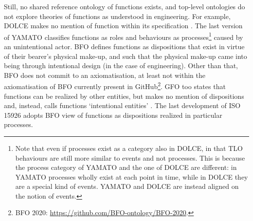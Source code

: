 \documentclass[sw]{iosart2x}
\newcommand{\DOLCE}{\textsc{DOLCE}\xspace} %
\newcommand{\YAMATO}{\textsc{YAMATO}\xspace}
\newcommand{\BFO}{\textsc{BFO}\xspace}
\newcommand{\GFO}{\textsc{GFO}\xspace}
\newcommand{\TLO}{\textnormal{TLO}\xspace}
\newcommand{\quotes}[1]{`#1'}
\newcommand{\TODO}[1]{{\color{red} #1
}}
\begin{document}
Still, no shared reference ontology of functions exists, and top-level ontologies do not explore theories of functions as understood in engineering. 
For example, \DOLCE makes no mention of function within its specification \cite{masoloWonderWebDeliverableD182003}.%
The last version of \YAMATO classifies functions as roles and behaviours as processes\footnote{Note that even if processes exist as a category also in \DOLCE, in that \TLO behaviours are still more similar to events and not processes. This is because the process category of \YAMATO and the one of \DOLCE are different: in \YAMATO processes wholly exist at each point in time, while in \DOLCE they are a special kind of events. \YAMATO  and \DOLCE are instead aligned on the notion of events. %
} 
caused by an unintentional actor. %
\BFO defines functions as dispositions %
that exist in virtue of their bearer's physical make-up, and such that the physical make-up came into being through intentional design (in the case of engineering). Other than that, \BFO does not commit to an axiomatisation, at least not within the axiomatisation of BFO currently present in GitHub\footnote{BFO 2020: \url{https://github.com/BFO-ontology/BFO-2020}.}.
\GFO too states that functions can be realized by other entities, but makes no mention of dispositions and, instead, calls functions \quotes{intentional entities} \cite{herreGeneralFormalOntology2006}.
The last development of ISO 15926 \cite{kluwerISO159261420202020} adopts \BFO view of functions as dispositions realized in particular processes.
\end{document}
